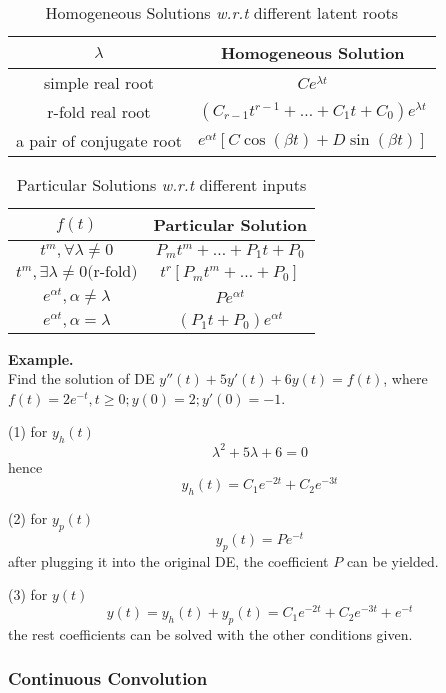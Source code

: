  \begin{table}[!h]
	 \begin{center}
		 \begin{tabular}{|c|c|}
			 \hline
			 $\lambda$ & Homogeneous Solution \\
			 \hline\hline
			 simple real root   & $Ce^{\lambda t}$ \\
			 r-fold real root   & $(C_{r-1}t^{r-1}+ \ldots + C_1 t + C_0)e^{\lambda t}$ \\
			 a pair of conjugate root & $e^{\alpha t}[C\cos(\beta t)+D\sin(\beta t)]$ \\
			 \hline
		 \end{tabular}
		 \caption{Homogeneous Solutions \emph{w.r.t} different latent roots}
	 \end{center}
 \end{table}
 \begin{table}[!h]
	 \begin{center}
		 \begin{tabular}{|c|c|}
			 \hline
			 $f(t)$ & Particular Solution \\
			 \hline\hline
			 $t^m, \forall \lambda \neq 0$   & $P_m t^m + \ldots + P_1 t + P_0$ \\
			 $t^m, \exists \lambda \neq 0 \text{(r-fold)}$   & $t^r[P_m t^m + \ldots + P_0]$ \\
			 $e^{\alpha t}, \alpha \neq \lambda$ & $Pe^{\alpha t}$\\
			 $e^{\alpha t}, \alpha = \lambda$ & $(P_1 t + P_0)e^{\alpha t}$\\
			 \hline
		 \end{tabular}
		 \caption{Particular Solutions \emph{w.r.t} different inputs}
	 \end{center}
 \end{table}

 {\bf Example.}\\
 Find the solution of DE $ y''(t) + 5y'(t) + 6y(t) = f(t)$, where
 $f(t)=2e^{-t}, t\geq 0; y(0) = 2; y'(0) = -1$.

 (1) for $y_h(t)$
 \[ \lambda^2 + 5\lambda + 6 = 0 \]
 hence
 \[ y_h(t) = C_1e^{-2t} + C_2e^{-3t}\]

 (2) for $y_p(t)$
 \[ y_p(t) = Pe^{-t}\]
 after plugging it into the original DE, the coefficient $P$ can be yielded.

 (3) for $y(t)$
 \[ y(t) = y_h(t) + y_p(t) = C_1e^{-2t} + C_2e^{-3t} + e^{-t}\]
 the rest coefficients can be solved with the other conditions given.

 \subsubsection{Continuous Convolution}

